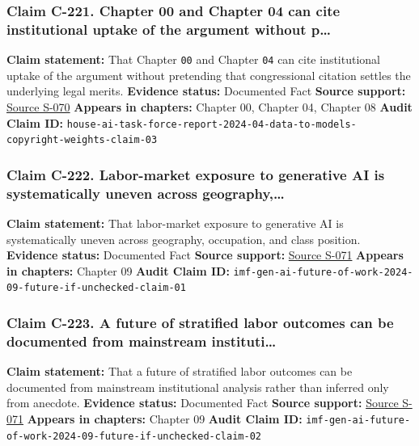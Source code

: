 \documentclass[
  american,
  11pt,
  letterpaper,
]{article}
\begin{document}
\subsubsection{Claim C-221. Chapter 00 and Chapter 04 can cite
institutional uptake of the argument without
p\ldots{}}\label{claim-c-221-chapter-00-and-chapter-04-can-cite-institutional-uptake-of-the-argument-without-p}

\textbf{Claim statement:} That Chapter \texttt{00} and Chapter
\texttt{04} can cite institutional uptake of the argument without
pretending that congressional citation settles the underlying legal
merits. \textbf{Evidence status:} Documented Fact \textbf{Source
support:}
\hyperref[source-s-070-bipartisan-house-task-force-report-on-artificial-intelligence]{Source
S-070} \textbf{Appears in chapters:} Chapter 00, Chapter 04, Chapter 08
\textbf{Audit Claim ID:}
\texttt{house-ai-task-force-report-2024-04-data-to-models-copyright-weights-claim-03}

\subsubsection{Claim C-222. Labor-market exposure to generative AI is
systematically uneven across
geography,\ldots{}}\label{claim-c-222-labor-market-exposure-to-generative-ai-is-systematically-uneven-across-geography}

\textbf{Claim statement:} That labor-market exposure to generative AI is
systematically uneven across geography, occupation, and class position.
\textbf{Evidence status:} Documented Fact \textbf{Source support:}
\hyperref[source-s-071-gen-ai-artificial-intelligence-and-the-future-of-work]{Source
S-071} \textbf{Appears in chapters:} Chapter 09 \textbf{Audit Claim ID:}
\texttt{imf-gen-ai-future-of-work-2024-09-future-if-unchecked-claim-01}

\subsubsection{Claim C-223. A future of stratified labor outcomes can be
documented from mainstream
instituti\ldots{}}\label{claim-c-223-a-future-of-stratified-labor-outcomes-can-be-documented-from-mainstream-instituti}

\textbf{Claim statement:} That a future of stratified labor outcomes can
be documented from mainstream institutional analysis rather than
inferred only from anecdote. \textbf{Evidence status:} Documented Fact
\textbf{Source support:}
\hyperref[source-s-071-gen-ai-artificial-intelligence-and-the-future-of-work]{Source
S-071} \textbf{Appears in chapters:} Chapter 09 \textbf{Audit Claim ID:}
\texttt{imf-gen-ai-future-of-work-2024-09-future-if-unchecked-claim-02}
\end{document}
